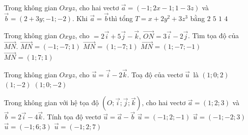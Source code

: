 \begin{ex}%
	Trong không gian $Oxyz$, cho  hai vectơ $\overrightarrow{a}=(-1;2x-1;1-3z)$ và $\overrightarrow{b}=(2+3y;-1;-2)$. Khi $\overrightarrow{a}=\overrightarrow{b}$thì tổng $T=x+2y^2+3z^3$ bằng
	\choice 
		{$2$} 
		{\True  $5$}
		 {$1$}
		{$4$} 
\end{ex}

\begin{ex}%
	Trong không gian $Oxyz$, cho $=2\overrightarrow{i}+5\overrightarrow{j}-\overrightarrow{k},\,\overrightarrow{ON}=3\overrightarrow{i}-2\overrightarrow{j}$. Tìm tọa độ của  $\overrightarrow{MN}$.
	 \choice
		 {$\overrightarrow{MN}=(-1;-7;1)$}
		{\True $\overrightarrow{MN}=(1;-7;1)$} 
		 {$\overrightarrow{MN}=(1;-7;-1)$}
		 {$\overrightarrow{MN}=(1;7;1)$}
\end{ex}

\begin{ex}%
	Trong không gian $Oxyz$, cho $\overrightarrow{u}=\overrightarrow{i}-2 \overrightarrow{k}$.  Toạ độ của vectơ $\overrightarrow{u}$~là
		{$(1; 0;  2)$}
		 {$(1;-2)$}
		{\True $(1;  0;-2)$}
\end{ex}

\begin{ex}%
	Trong không gian với hệ tọa độ $(O;\overrightarrow{i};\overrightarrow{j};\overrightarrow{k})$, cho hai vectơ  $\overrightarrow{a}=(1;2;3)$ và $\overrightarrow{b}=2\overrightarrow{i}-4\overrightarrow{k}$. Tính tọa độ vectơ $\overrightarrow{u}=\overrightarrow{a}-\overrightarrow{b}$
	 \choice
		 {$\overrightarrow{u}=(-1;2;-1)$}
		{$\overrightarrow{u}=(-1;-2;3)$} 
		 {$\overrightarrow{u}=(-1;6;3)$}
		 {\True $\overrightarrow{u}=(-1;2;7)$}
\end{ex}

